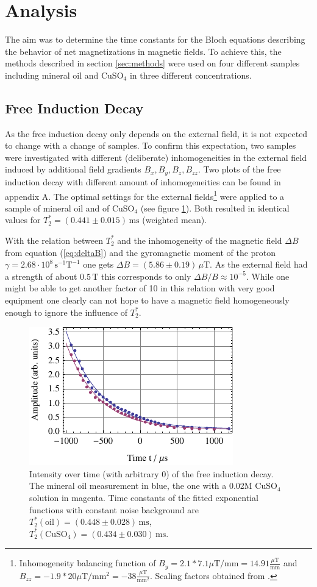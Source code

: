\documentclass[a4paper]{scrartcl}
\numberwithin{equation}{section}
\numberwithin{figure}{section}
\numberwithin{table}{section}
\begin{document}
\section{Analysis}
The aim was to determine the time constants for the Bloch equations describing the behavior of net magnetizations in magnetic fields. To achieve this, the methods described in section \ref{sec:methods} were used on four different samples including mineral oil and CuSO$_4$ in three different concentrations.

\subsection{Free Induction Decay}
As the free induction decay only depends on the external field, it is not expected to change with a change of samples. To confirm this expectation, two samples were investigated with different (deliberate) inhomogeneities in the external field induced by additional field gradients $B_x, B_y, B_z, B_{zz}$. Two plots of the free induction decay with different amount of inhomogeneities can be found in appendix A. The optimal settings for the external fields\footnote{Inhomogeneity balancing function of $B_y=2.1*7.1 \mu \text{T} /\text{mm} = 14.91 \frac{\mu \text{T}}{\text{mm}} $ and $B_{zz} = -1.9 * 20 \mu \text{T} / \text{mm}^2 =-38 \frac{\mu \text{T}}{\text{mm}^2} $. Scaling factors obtained from \cite{hersteller}.} were applied to a sample of mineral oil and of CuSO$_4$ (see figure \ref{fig:fid}). Both resulted in identical values for $T_2^* = (0.441\pm 0.015)\,\text{ms}$ (weighted mean).

With the relation between $T_2^*$ and the inhomogeneity of the magnetic field $\Delta B$ from equation (\ref{eq:deltaB}) and the gyromagnetic moment of the proton $\gamma=2.68\cdot 10^8 \, \text{s}^{-1}\text{T}^{-1}$ one gets $\Delta B = (5.86\pm 0.19)\,\mu\text{T}$. As the external field had a strength of about $0.5\,\text{T}$ this corresponds to only $\Delta B / B \approx 10^{-5}$. While one might be able to get another factor of 10 in this relation with very good equipment one clearly can not hope to have a magnetic field homogeneously enough to ignore the influence of $T_2^*$.

\begin{figure}
\centering
	\includegraphics[width=0.5\linewidth]{img/t2st.pdf}
	\caption{\small Intensity over time (with arbitrary 0) of the free induction decay. The mineral oil measurement in blue, the one with a 0.02M CuSO$_4$ solution in magenta. Time constants of the fitted exponential functions with constant noise background are $T_2^*(\text{oil})=(0.448\pm 0.028)\,\text{ms}$, $T_2^*(\text{CuSO}_4)=(0.434\pm 0.030)\,\text{ms}$. }
	\label{fig:fid}
\end{figure}
\end{document}
